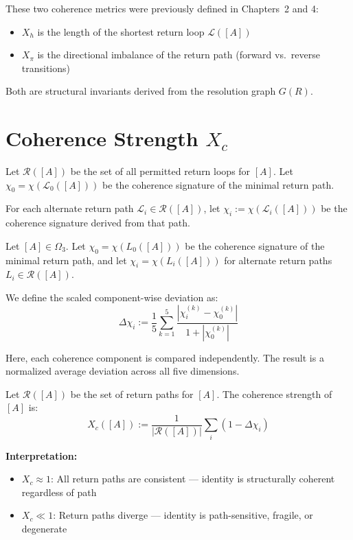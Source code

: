 These two coherence metrics were previously defined in Chapters~2 and 4:

\begin{itemize}
  \item $X_h$ is the length of the shortest return loop $\mathcal{L}([A])$
  \item $X_\pi$ is the directional imbalance of the return path (forward vs.\ reverse transitions)
\end{itemize}

Both are structural invariants derived from the resolution graph $G(R)$.

\section{Coherence Strength $X_c$}

Let $\mathcal{R}([A])$ be the set of all permitted return loops for $[A]$.  
Let $\chi_0 = \chi(\mathcal{L}_0([A]))$ be the coherence signature of the minimal return path.

For each alternate return path $\mathcal{L}_i \in \mathcal{R}([A])$, let $\chi_i := \chi(\mathcal{L}_i([A]))$  
be the coherence signature derived from that path.

\begin{definition} \label{def:component-deviation}
Let $[A] \in \Omega_3$. Let $\chi_0 = \chi(L_0([A]))$ be the coherence signature of the minimal return path, and let $\chi_i = \chi(L_i([A]))$ for alternate return paths $L_i \in \mathcal{R}([A])$.

We define the scaled component-wise deviation as:
\[
\Delta \chi_i := \frac{1}{5} \sum_{k=1}^5 \frac{\left| \chi_i^{(k)} - \chi_0^{(k)} \right|}{1 + \left| \chi_0^{(k)} \right|}
\]
\end{definition}

Here, each coherence component is compared independently.  
The result is a normalized average deviation across all five dimensions.

\begin{definition} \label{def:coherence-strength}
Let $\mathcal{R}([A])$ be the set of return paths for $[A]$. The coherence strength of $[A]$ is:
\[
X_c([A]) := \frac{1}{|\mathcal{R}([A])|} \sum_{i} \left( 1 - \Delta \chi_i \right)
\]
\end{definition}

\textbf{Interpretation:}
\begin{itemize}
  \item $X_c \approx 1$: All return paths are consistent — identity is structurally coherent regardless of path
  \item $X_c \ll 1$: Return paths diverge — identity is path-sensitive, fragile, or degenerate
\end{itemize}

